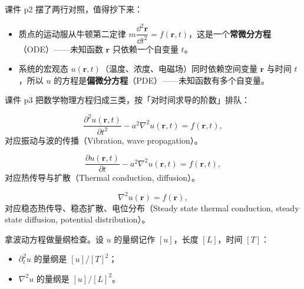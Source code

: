 \documentclass[11pt]{ctexart}
\let\origsubhdr\subhdr
\renewcommand{\subhdr}[1]{\par\needspace{3\baselineskip}\origsubhdr{#1}}
\let\orighdr\hdr
\renewcommand{\hdr}[2]{\par\needspace{6\baselineskip}\orighdr{#1}{#2}}
\begin{document}


课件 p2 摆了两行对照，值得抄下来：

\begin{itemize}
\item 质点的运动服从牛顿第二定律 $m\dfrac{\dd^2\mathbf r}{\dd t^2}=f(\mathbf r,t)$，这是一个\textbf{常微分方程}（ODE）——未知函数 $\mathbf r$ 只依赖一个自变量 $t$。
\item 系统的宏观态 $u(\mathbf r,t)$（温度、浓度、电磁场）同时依赖空间变量 $\mathbf r$ 与时间 $t$，所以 $u$ 的方程是\textbf{偏微分方程}（PDE）——未知函数有多个自变量。
\end{itemize}



课件 p3 把数学物理方程归成三类，按「对时间求导的阶数」排队：

\[
\frac{\partial^2 u(\mathbf r,t)}{\partial t^2}-a^2\nabla^2u(\mathbf r,t)=f(\mathbf r,t),
\]
对应振动与波的传播（Vibration, wave propagation）。

\[
\frac{\partial u(\mathbf r,t)}{\partial t}-a^2\nabla^2u(\mathbf r,t)=f(\mathbf r,t),
\]
对应热传导与扩散（Thermal conduction, diffusion）。

\[
\nabla^2u(\mathbf r)=f(\mathbf r),
\]
对应稳态热传导、稳态扩散、电位分布（Steady state thermal conduction, steady state diffusion, potential distribution）。



拿波动方程做量纲检查。设 $u$ 的量纲记作 $[u]$，长度 $[L]$，时间 $[T]$：

\begin{itemize}
\item $\partial_t^2u$ 的量纲是 $[u]/[T]^2$；
\item $\nabla^2u$ 的量纲是 $[u]/[L]^2$。
\end{itemize}
\end{document}
